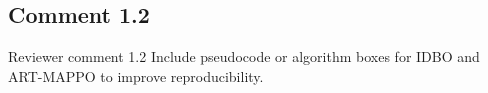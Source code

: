 \documentclass[11pt]{article}
\begin{document}

\subsection*{Comment 1.2 }

\begin{reviewercomment}{Reviewer comment 1.2}
Include pseudocode or algorithm boxes for IDBO and ART-MAPPO to improve
reproducibility.
\end{reviewercomment}
\end{document}
